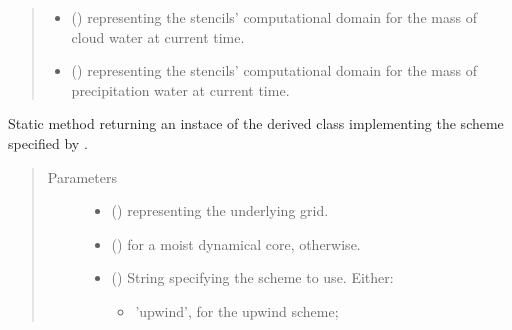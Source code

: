 \documentclass[letterpaper,10pt,english]{sphinxmanual}
\begin{document}
\begin{fulllineitems}
\begin{fulllineitems}
\begin{quote}
\begin{description}
\begin{itemize}
\item {} 
 () \textendash{}  representing the stencils’ computational domain for the mass of cloud water
at current time.

\item {} 
 () \textendash{}  representing the stencils’ computational domain for the mass of precipitation water
at current time.

\end{itemize}

\end{description}\end{quote}

\end{fulllineitems}


\begin{fulllineitems}
\label{\detokenize{api:dycore.prognostic_isentropic.PrognosticIsentropic.factory}}
Static method returning an instace of the derived class implementing the scheme specified by .
\begin{quote}\begin{description}
\item[{Parameters}] \leavevmode\begin{itemize}
\item {} 
 () \textendash{} {\hyperref[\detokenize{api:grids.grid_xyz.GridXYZ}]{}} representing the underlying grid.

\item {} 
 () \textendash{}  for a moist dynamical core,  otherwise.

\item {} 
 () \textendash{} 
String specifying the scheme to use. Either:
\begin{itemize}
\item {} 
’upwind’, for the upwind scheme;


\end{itemize}
\end{itemize}
\end{description}
\end{quote}
\end{fulllineitems}
\end{fulllineitems}
\end{document}
